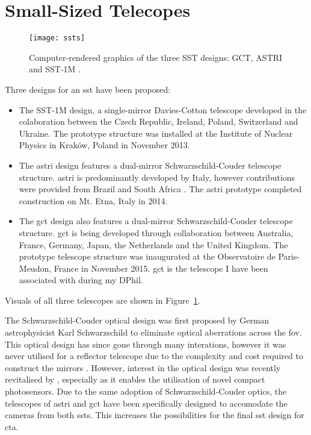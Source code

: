 \section{Small-Sized Telecopes}

\begin{figure}
	\centering\texttt{[image: ssts]} 
	\caption[The three SST designs.]{Computer-rendered graphics of the three SST designs: GCT, ASTRI and SST-1M \cite{cta-sst}.}
	\label{fig:ssts}
\end{figure}

Three designs for an \gls{sst} have been proposed:
\begin{itemize}
\item The SST-1M design, a single-mirror Davies-Cotton telescope developed in the colaboration between the Czech Republic, Ireland, Poland, Switzerland and Ukraine. The prototype structure was installed at the Institute of Nuclear Physics in Kraków, Poland in November 2013.
\item The \gls{astri} design features a dual-mirror Schwarzschild-Couder telescope structure. \gls{astri} is predominantly developed by Italy, however contributions were provided from Brazil and South Africa \cite{cta-sst}. The \gls{astri} prototype completed construction on Mt. Etna, Italy in 2014.
\item The \gls{gct} design also features a dual-mirror Schwarzschild-Couder telescope structure. \gls{gct} is being developed through collaboration between Australia, France, Germany, Japan, the Netherlands and the United Kingdom. The prototype telescope structure was inaugurated at the Observatoire de Paris-Meudon, France in November 2015. \gls{gct} is the telescope I have been associated with during my DPhil.
\end{itemize}
Visuals of all three telescopes are shown in Figure~\ref{fig:ssts}.

The Schwarzschild-Couder optical design was first proposed by German astrophysicist Karl Schwarzschild to eliminate optical aberrations across the \gls{fov}. This optical design has since gone through many interations, however it was never utilised for a reflector telescope due to the complexity and cost required to construct the mirrors \cite{Giro2017}. However, interest in the optical design was recently revitalised by \textcite{Vassiliev2007}, especially as it enables the utilisation of novel compact photosensors. Due to the same adoption of Schwarzschild-Couder optics, the telescopes of \gls{astri} and \gls{gct} have been specifically designed to accomodate the cameras from both \glspl{sst}. This increases the possibilities for the final \gls{sst} design for \gls{cta}.


